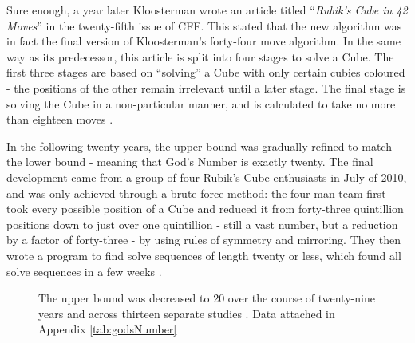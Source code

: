 \documentclass{report}
\newcommand{\tit}[1]{\textit{#1}}
\newcommand{\propernoun}[1]{\enquote{\tit{#1}}}
\begin{document}
    Sure enough, a year later Kloosterman wrote an article titled \propernoun{Rubik's Cube in 42 Moves} in the twenty-fifth issue of CFF. This stated that the new algorithm was in fact the final version of Kloosterman's forty-four move algorithm. In the same way as its predecessor, this article is split into four stages to solve a Cube. The first three stages are based on \enquote{solving} a Cube with only certain cubies coloured - the positions of the other remain irrelevant until a later stage. The final stage is solving the Cube in a non-particular manner, and is calculated to take no more than eighteen moves \cite{Kloosterman1990}.
    
    In the following twenty years, the upper bound was gradually refined to match the lower bound - meaning that God's Number is exactly twenty. The final development came from a group of four Rubik's Cube enthusiasts in July of 2010, and was only achieved through a brute force method: the four-man team first took every possible position of a Cube and reduced it from forty-three quintillion positions down to just over one quintillion - still a vast number, but a reduction by a factor of forty-three - by using rules of symmetry and mirroring. They then wrote a program to find solve sequences of length twenty or less, which found all solve sequences in a few weeks \cite{Rokicki2010}.
    
   	\begin{figure}[H]
   		\centering
   		\caption{The upper bound was decreased to 20 over the course of twenty-nine years and across thirteen separate studies \cite{Rokicki2010}. Data attached in Appendix \ref{tab:godsNumber}}
		\label{fig:godsnumbergraph}
	\end{figure}
\end{document}
